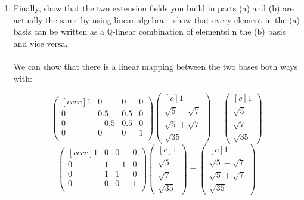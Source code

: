 \begin{enumerate}
\begin{enumerate}
      \item Finally, show that the two extension fields you build in parts (a) and (b) are actually the same by using linear algebra -- show that every element in the (a) basis can be written as a $\mathds{Q}$-linear combination of elementsi n the (b) basis and vice versa.\\\\

        We can show that there is a linear mapping between the two bases both ways with:

        $$
          \begin{pmatrix}[cccc]
            1 & 0 & 0 & 0 \\
            0 & 0.5 & 0.5 & 0 \\
            0 & -0.5 & 0.5 & 0 \\
            0 & 0 & 0 & 1 \\
          \end{pmatrix}
          \begin{pmatrix}[c]
            1 \\
            \sqrt{5} - \sqrt{7} \\
            \sqrt{5} + \sqrt{7} \\
            \sqrt{35}            
          \end{pmatrix}
          =
          \begin{pmatrix}[c]
            1 \\
            \sqrt{5} \\
            \sqrt{7} \\
            \sqrt{35}            
          \end{pmatrix}          
        $$
        $$
          \begin{pmatrix}[cccc]
            1 & 0 & 0 & 0 \\
            0 & 1 & -1 & 0 \\
            0 & 1 & 1 & 0 \\
            0 & 0 & 0 & 1 \\
          \end{pmatrix}
          \begin{pmatrix}[c]
            1 \\
            \sqrt{5} \\
            \sqrt{7} \\
            \sqrt{35}            
          \end{pmatrix}
          =
          \begin{pmatrix}[c]
            1 \\
            \sqrt{5} - \sqrt{7} \\
            \sqrt{5} + \sqrt{7} \\
            \sqrt{35}            
          \end{pmatrix}
        $$


\end{enumerate}
\end{enumerate}
